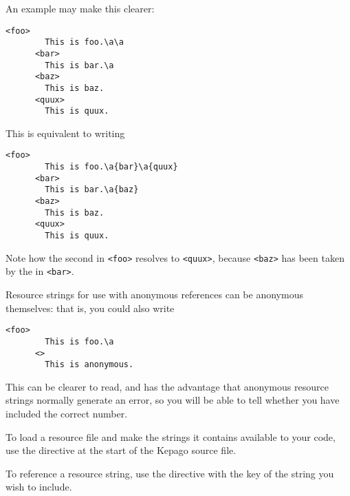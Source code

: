     An example may make this clearer:
    \begin{lstlisting}[basicstyle=\ttfamily,stringstyle=\color{black}]
      <foo>
        This is foo.\a\a
      <bar>
        This is bar.\a
      <baz>
        This is baz.
      <quux>
        This is quux.
    \end{lstlisting}
    This is equivalent to writing
    \begin{lstlisting}[basicstyle=\ttfamily,stringstyle=\color{black}]
      <foo>
        This is foo.\a{bar}\a{quux}
      <bar>
        This is bar.\a{baz}
      <baz>
        This is baz.
      <quux>
        This is quux.
    \end{lstlisting}
    Note how the second  in \lstinline|<foo>| resolves to
    \lstinline|<quux>|, because \lstinline|<baz>| has been taken by the
     in \lstinline|<bar>|.

    Resource strings for use with anonymous references can be anonymous
    themselves: that is, you could also write
    \begin{lstlisting}[basicstyle=\ttfamily,stringstyle=\color{black}]
      <foo>
        This is foo.\a
      <>
        This is anonymous.
    \end{lstlisting}
    This can be clearer to read, and has the advantage that anonymous
    resource strings normally generate an error, so you will be able to
    tell whether you have included the correct number.


    To load a resource file and make the strings it contains available to your
    code, use the  directive at the start of the Kepago source
    file.

    To reference a resource string, use the  directive with the key
    of the string you wish to include.
